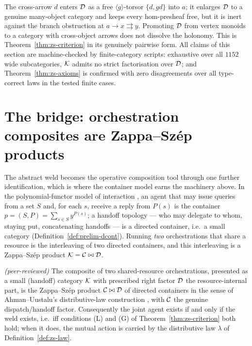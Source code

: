 \begin{remark}\label{rem:zs-inert}
The cross-arrow $d$ enters $\mathcal{D}$ as a free $\langle g\rangle$-torsor $\{d,gd\}$ into
$a$; it enlarges $\mathcal{D}$ to a genuine many-object category and keeps every hom-presheaf
free, but it is inert against the branch obstruction at $a\to x\rightrightarrows y$.
Promoting $\mathcal{D}$ from vertex monoids to a category with cross-object arrows does not
dissolve the holonomy. This is Theorem~\ref{thm:zs-criterion} in its genuinely
pairwise form. All claims of this section are machine-checked by finite-category
scripts: exhaustive over all $1152$ wide subcategories, $\mathcal{K}$ admits no strict
factorisation over $\mathcal{D}$; and Theorem~\ref{thm:zs-axioms} is confirmed with zero
disagreements over all type-correct laws in the tested finite cases.
\end{remark}

\section{The bridge: orchestration composites are Zappa--Sz\'ep products}\label{sec:zs-bridge}

The abstract weld becomes the operative composition tool through one further
identification, which is where the container model earns the machinery above. In
the polynomial-functor model of interaction \cite{NiuSpivak}, an agent that may
issue queries from a set $S$ and, for each $s$, receive a reply from $P(s)$ is the
container $p=(S,P)=\sum_{s\in S}y^{P(s)}$; a handoff topology --- who may delegate
to whom, staying put, concatenating handoffs --- is a directed container, i.e.\ a
small category (Definition~\ref{def:prelim-dcont}). Running \emph{two}
orchestrations that share a resource is the interleaving of two directed
containers, and this interleaving is a Zappa--Sz\'ep product $\mathcal{K}=\mathcal{C}\bowtie\mathcal{D}$.

\begin{proposition}\label{prop:zs-bridge}
\emph{(peer-reviewed)}\;
The composite of two shared-resource orchestrations, presented as a small
(handoff) category $\mathcal{K}$ with prescribed right factor $\mathcal{D}$ the resource-internal
part, is the Zappa--Sz\'ep product $\mathcal{C}\bowtie\mathcal{D}$ of directed containers in the sense
of Ahman--Uustalu's distributive-law construction \cite{AhmanUustaluDL}, with $\mathcal{C}$
the genuine dispatch/handoff factor. Consequently the joint agent exists if and only
if the weld exists, i.e.\ iff conditions \textnormal{(L)} and \textnormal{(G)} of
Theorem~\ref{thm:zs-criterion} both hold; when it does, the mutual action is carried
by the distributive law $\lambda$ of Definition~\ref{def:zs-law}.
\end{proposition}

